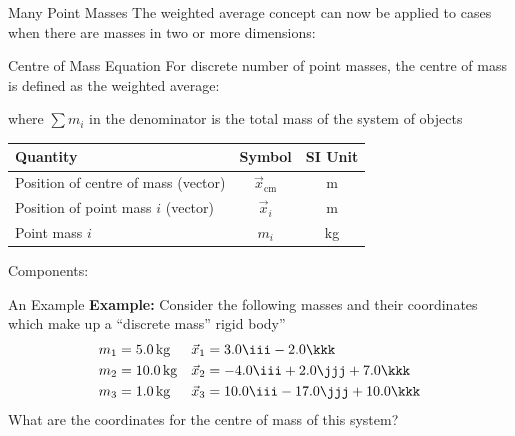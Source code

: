 \documentclass[12pt,compress,aspectratio=169]{beamer}
\begin{document}
\begin{frame}{Many Point Masses}
  The weighted average concept can now be applied to cases when there are
  masses in two or more dimensions:
  \begin{center}
  \end{center}
\end{frame}



\begin{frame}{Centre of Mass Equation}
  For discrete number of point masses, the centre of mass is defined
  as the weighted average:

  where $\sum m_i$ in the denominator is the total mass of the system of objects
  \begin{center}
    \begin{tabular}{l|c|c}
      \rowcolor{pink}
      \textbf{Quantity} & \textbf{Symbol} & \textbf{SI Unit} \\ \hline
      Position of centre of mass (vector) & $\vec x_\text{cm}$ & \si\metre \\
      Position of point mass $i$ (vector) & $\vec x_i$ & \si\metre \\
      Point mass $i$ & $m_i$ & \si{\kilo\gram}
    \end{tabular}
  \end{center}
  Components:

\end{frame}



\begin{frame}{An Example}
  \textbf{Example:} Consider the following masses and their coordinates
  which make up a ``discrete mass'' rigid body''
  \begin{align*}
    m_1&=\SI{5.0}{\kg} &\vec x_1&=3.0\iii-2.0\kkk\\
    m_2&=\SI{10.0}{\kg}&\vec x_2&=-4.0\iii+2.0\jjj+7.0\kkk\\
    m_3&=\SI{1.0}{\kg}&\vec x_3&=10.0\iii-17.0\jjj+10.0\kkk
  \end{align*}
  What are the coordinates for the centre of mass of this system?
\end{frame}
\end{document}
